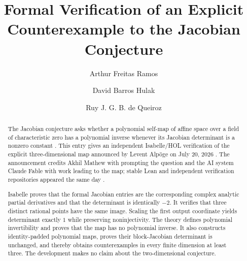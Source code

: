 \documentclass[11pt,a4paper]{article}
\begin{document}
\title{Formal Verification of an Explicit Counterexample to the Jacobian Conjecture}
\author{Arthur Freitas Ramos \and David Barros Hulak \and Ruy J. G. B. de Queiroz}
\maketitle

\begin{abstract}
The Jacobian conjecture asks whether a polynomial self-map of affine space
over a field of characteristic zero has a polynomial inverse whenever its
Jacobian determinant is a nonzero constant
\cite{Keller1939,vanDenEssen2000}.  This entry gives an independent
Isabelle/HOL verification of the explicit three-dimensional map announced by
Levent Alpöge on July 20, 2026 \cite{Alpoge2026}.  The announcement credits
Akhil Mathew with prompting the question and the AI system Claude Fable with
work leading to the map; stable Lean and independent verification repositories
appeared the same day \cite{Cureton2026,Harrison2026}.

Isabelle proves that the formal Jacobian entries are the corresponding complex
analytic partial derivatives and that the determinant is identically $-2$.
It verifies that three distinct rational points have the same image.  Scaling
the first output coordinate yields determinant exactly $1$ while preserving
noninjectivity.  The theory defines polynomial invertibility and proves that
the map has no polynomial inverse.  It also constructs identity-padded
polynomial maps, proves their block-Jacobian determinant is unchanged, and
thereby obtains counterexamples in every finite dimension at least three.  The
development makes no claim about the two-dimensional conjecture.
\end{abstract}

\newpage
\tableofcontents
\newpage





\end{document}
